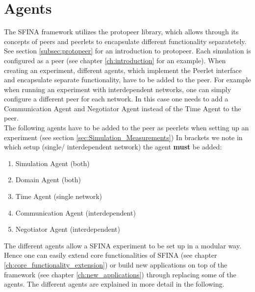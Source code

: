\documentclass[11pt,fleqn]{book} %
\newcommand{\MainAgent}{Simulation Agent}
\newcommand{\TimeAgent}{Time Agent}
\newcommand{\CommunicationAgent}{Communication Agent}
\newcommand{\DomainAgent}{Domain Agent} %
\newcommand{\NegotiatorAgent}{Negotiator Agent}
\begin{document}
\chapter{Agents}\label{sec:agents}
The SFINA framework utilizes the protopeer library, which allows through its concepts of peers and peerlets to encapsulate different functionality separatetely. See section \ref{subsec:protopeer} for an introduction to protopeer. Each simulation is configured as a peer (see chapter \ref{ch:introduction} for an example). When creating an experiment, different agents, which implement the Peerlet interface and encapsulate separate functionality, have to be added to the peer. For example when running an experiment with interdependent networks, one can simply configure a different peer for each network. In this case one needs to add a \CommunicationAgent{} and \NegotiatorAgent{} instead of the \TimeAgent{} to the peer.\\
The following agents have to be added to the peer as peerlets when setting up an experiment (see section \ref{sec:Simulation_Measurements}) In brackets we note in which setup (single/ interdependent network) the agent \textbf{must} be added:
\begin{enumerate}
	\item \MainAgent \tabto{4cm} (both)
	\item \DomainAgent \tabto{4cm} (both)
	\item \TimeAgent \tabto{4cm} (single network)
	\item \CommunicationAgent  \tabto{4cm} (interdependent)
	\item \NegotiatorAgent \tabto{4cm} (interdependent)
\end{enumerate}
The different agents allow a SFINA experiment to be set up in a modular way. Hence one can easily extend core functionalities of SFINA (see chapter \ref{ch:core_functionality_extension}) or build new applications on top of the framework (see chapter \ref{ch:new_applications}) through replacing some of the agents. The different agents are explained in more detail in the following.

\end{document}
